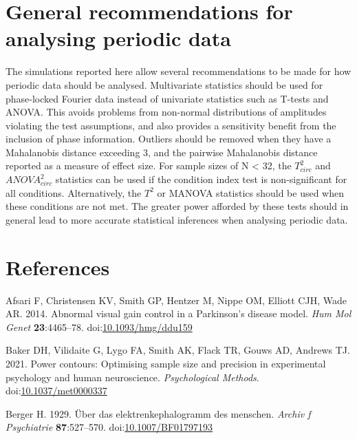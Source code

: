 \documentclass[]{article}
\begin{document}
\hypertarget{general-recommendations-for-analysing-periodic-data}{%
\section{General recommendations for analysing periodic data}\label{general-recommendations-for-analysing-periodic-data}}

The simulations reported here allow several recommendations to be made for how periodic data should be analysed. Multivariate statistics should be used for phase-locked Fourier data instead of univariate statistics such as T-tests and ANOVA. This avoids problems from non-normal distributions of amplitudes violating the test assumptions, and also provides a sensitivity benefit from the inclusion of phase information. Outliers should be removed when they have a Mahalanobis distance exceeding 3, and the pairwise Mahalanobis distance reported as a measure of effect size. For sample sizes of N \textless{} 32, the \(T^2_{circ}\) and \(ANOVA^2_{circ}\) statistics can be used if the condition index test is non-significant for all conditions. Alternatively, the \(T^2\) or MANOVA statistics should be used when these conditions are not met. The greater power afforded by these tests should in general lead to more accurate statistical inferences when analysing periodic data.

\hypertarget{references}{%
\section*{References}\label{references}}

\hypertarget{refs}{}
\leavevmode\hypertarget{ref-Afsari2014}{}%
Afsari F, Christensen KV, Smith GP, Hentzer M, Nippe OM, Elliott CJH, Wade AR. 2014. Abnormal visual gain control in a Parkinson's disease model. \emph{Hum Mol Genet} \textbf{23}:4465--78. doi:\href{https://doi.org/10.1093/hmg/ddu159}{10.1093/hmg/ddu159}

\leavevmode\hypertarget{ref-Baker2021}{}%
Baker DH, Vilidaite G, Lygo FA, Smith AK, Flack TR, Gouws AD, Andrews TJ. 2021. Power contours: Optimising sample size and precision in experimental psychology and human neuroscience. \emph{Psychological Methods}. doi:\href{https://doi.org/10.1037/met0000337}{10.1037/met0000337}

\leavevmode\hypertarget{ref-Berger1929}{}%
Berger H. 1929. Über das elektrenkephalogramm des menschen. \emph{Archiv f Psychiatrie} \textbf{87}:527--570. doi:\href{https://doi.org/10.1007/BF01797193}{10.1007/BF01797193}
\end{document}
